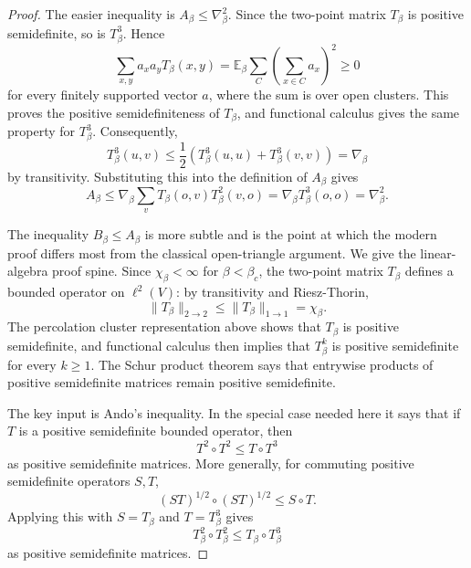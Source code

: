 \documentclass[11pt,reqno]{book}
\numberwithin{equation}{chapter}
\theoremstyle{plain}
\theoremstyle{definition}
\theoremstyle{remark}
\newcommand{\1}{\mathbf 1}
\begin{document}
\begin{proof}
The easier inequality is \(A_\beta\leq\nabla_\beta^2\). Since the two-point matrix \(T_\beta\) is positive semidefinite, so is \(T_\beta^3\). Hence
\[
  \sum_{x,y}a_xa_yT_\beta(x,y)
  =
  \mathbb E_\beta\sum_C
  \left(\sum_{x\in C}a_x\right)^2
  \geq0
\]
for every finitely supported vector \(a\), where the sum is over open clusters. This proves the positive semidefiniteness of \(T_\beta\), and functional calculus gives the same property for \(T_\beta^3\). Consequently,
\[
  T_\beta^3(u,v)
  \leq
  \frac12\left(T_\beta^3(u,u)+T_\beta^3(v,v)\right)
  =
  \nabla_\beta
\]
by transitivity. Substituting this into the definition of \(A_\beta\) gives
\[
  A_\beta
  \leq
  \nabla_\beta\sum_vT_\beta(o,v)T_\beta^2(v,o)
  =
  \nabla_\beta T_\beta^3(o,o)
  =
  \nabla_\beta^2.
\]

The inequality \(B_\beta\leq A_\beta\) is more subtle and is the point at which the modern proof differs most from the classical open-triangle argument. We give the linear-algebra proof spine. Since \(\chi_\beta<\infty\) for \(\beta<\beta_c\), the two-point matrix \(T_\beta\) defines a bounded operator on \(\ell^2(V)\): by transitivity and Riesz-Thorin,
\[
  \|T_\beta\|_{2\to2}
  \leq
  \|T_\beta\|_{1\to1}
  =
  \chi_\beta.
\]
The percolation cluster representation above shows that \(T_\beta\) is
positive semidefinite, and functional calculus then implies that \(T_\beta^k\)
is positive semidefinite for every \(k\geq1\). The Schur product theorem says
that entrywise products of positive semidefinite matrices remain positive
semidefinite.

The key input is Ando's inequality. In the special case needed here it says
that if \(T\) is a positive semidefinite bounded operator, then
\[
  T^2\circ T^2\leq T\circ T^3
\]
as positive semidefinite matrices. More generally, for commuting positive
semidefinite operators \(S,T\),
\[
  (ST)^{1/2}\circ (ST)^{1/2}\leq S\circ T.
\]
Applying this with \(S=T_\beta\) and \(T=T_\beta^3\) gives
\[
  T_\beta^2\circ T_\beta^2
  \leq
  T_\beta\circ T_\beta^3
\]
as positive semidefinite matrices.


\end{proof}
\end{document}
